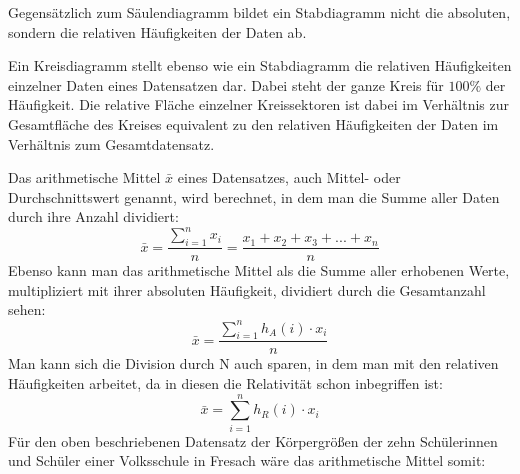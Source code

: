 \pagebreak


Gegens\"{a}tzlich zum S\"{a}ulendiagramm bildet ein Stabdiagramm nicht die absoluten, sondern die relativen H\"{a}ufigkeiten der Daten ab.

\begin{figure}[h!]
\end{figure} 


Ein Kreisdiagramm stellt ebenso wie ein Stabdiagramm die relativen H\"{a}ufigkeiten einzelner Daten eines Datensatzen dar. Dabei steht der ganze Kreis f\"{u}r $100 \%$ der H\"{a}ufigkeit. Die relative Fl\"{a}che einzelner Kreissektoren ist dabei im Verh\"{a}ltnis zur Gesamtfl\"{a}che des Kreises equivalent zu den relativen H\"{a}ufigkeiten der Daten im Verh\"{a}ltnis zum Gesamtdatensatz.

\begin{figure}[h!]
\end{figure}

\pagebreak



Das arithmetische Mittel $\bar{x}$ eines Datensatzes, auch Mittel- oder Durchschnittswert genannt, wird berechnet, in dem man die Summe aller Daten durch ihre Anzahl dividiert: $$\bar{x} = \frac{\sum_{i=1}^{n} x_i}{n} = \frac{x_{1} + x_{2} + x_{3} + ... + x_{n}}{n}$$ Ebenso kann man das arithmetische Mittel als die Summe aller erhobenen Werte, multipliziert mit ihrer absoluten H\"{a}ufigkeit, dividiert durch die Gesamtanzahl sehen: $$\bar{x} = \frac{\sum_{i=1}^{n} h_{A}(i) \cdot x_{i}}{n}$$ Man kann sich die Division durch N auch sparen, in dem man mit den relativen H\"{a}ufigkeiten arbeitet, da in diesen die Relativit\"{a}t schon inbegriffen ist: $$\bar{x} = \sum_{i=1}^{n} h_{R}(i) \cdot x_{i}$$ F\"{u}r den oben beschriebenen Datensatz der K\"{o}rpergr\"{o}\ss{}en der zehn Sch\"{u}lerinnen und Sch\"{u}ler einer Volksschule in Fresach w\"{a}re das arithmetische Mittel somit: 

